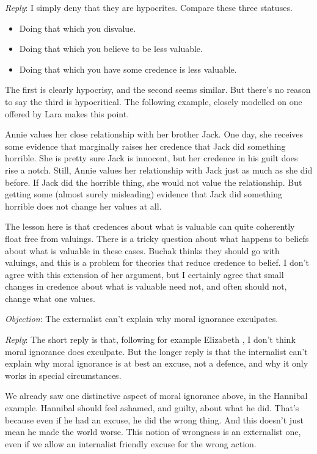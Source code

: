 \emph{Reply}: I simply deny that they are hypocrites. Compare these three statuses.

\begin{itemize}
\item Doing that which you disvalue.

\item Doing that which you believe to be less valuable.

\item Doing that which you have some credence is less valuable.

\end{itemize}
The first is clearly hypocrisy, and the second seems similar. But there's no reason to say the third is hypocritical. The following example, closely modelled on one offered by Lara  \citet{Buchak2013} makes this point.

Annie values her close relationship with her brother Jack. One day, she receives some evidence that marginally raises her credence that Jack did something horrible. She is pretty sure Jack is innocent, but her credence in his guilt does rise a notch. Still, Annie values her relationship with Jack just as much as she did before. If Jack did the horrible thing, she would not value the relationship. But getting some (almost surely misleading) evidence that Jack did something horrible does not change her values at all.

The lesson here is that credences about what is valuable can quite coherently float free from valuings. There is a tricky question about what happens to beliefs about what is valuable in these cases. Buchak thinks they should go with valuings, and this is a problem for theories that reduce credence to belief. I don't agree with this extension of her argument, but I certainly agree that small changes in credence about what is valuable need not, and often should not, change what one values.

\emph{Objection}: The externalist can't explain why moral ignorance exculpates.

\emph{Reply}: The short reply is that, following for example Elizabeth  \citet{EHarman2011}, I don't think moral ignorance does exculpate. But the longer reply is that the internalist can't explain why moral ignorance is at best an excuse, not a defence, and why it only works in special circumstances.

We already saw one distinctive aspect of moral ignorance above, in the Hannibal example. Hannibal should feel ashamed, and guilty, about what he did. That's because even if he had an excuse, he did the wrong thing. And this doesn't just mean he made the world worse. This notion of wrongness is an externalist one, even if we allow an internalist friendly excuse for the wrong action.

